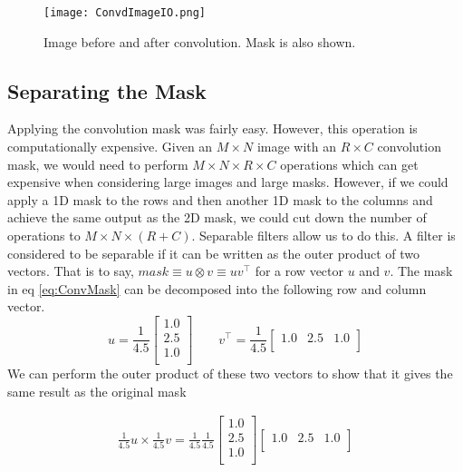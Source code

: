 \begin{figure}[!h]
    \texttt{[image: ConvdImageIO.png]}
    \centering
    \caption{Image before and after convolution. Mask is also shown.}
    \label{fig:ConvdImageIO}
\end{figure}

\subsection{Separating the Mask}
Applying the convolution mask was fairly easy. However, this operation is computationally expensive. Given an $M \times N$ image with an $R \times C$ convolution mask, we would need to perform $M \times N \times R \times C$ operations which can get expensive when considering large images and large masks. However, if we could apply a 1D mask to the rows and then another 1D mask to the columns and achieve the same output as the 2D mask, we could cut down the number of operations to $M \times N \times (R+C)$. Separable filters allow us to do this. A filter is considered to be separable if it can be written as the outer product of two vectors. That is to say, $mask \equiv u \otimes v \equiv uv^{\top}$ for a row vector $u$ and $v$. The mask in eq \ref{eq:ConvMask} can be decomposed into the following row and column vector.
\begin{equation}
    u = \frac{1}{4.5} 
    \begin{bmatrix}
        1.0 \\
        2.5 \\
        1.0 \\
    \end{bmatrix}
    \qquad
    v^{\top} = \frac{1}{4.5}
    \begin{bmatrix}
        1.0 & 2.5 & 1.0 \\
    \end{bmatrix}
\end{equation}
\pagebreak
We can perform the outer product of these two vectors to show that it gives the same result as the original mask

\begin{gather}
    \frac{1}{4.5}u \times \frac{1}{4.5}v = \frac{1}{4.5}\frac{1}{4.5}
    \begin{bmatrix}
        1.0 \\
        2.5 \\
        1.0 \\
    \end{bmatrix}
    \begin{bmatrix}
        1.0 & 2.5 & 1.0 \\
    \end{bmatrix}
\end{gather}

